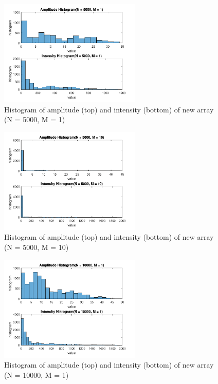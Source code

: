\documentclass{article}
\begin{document}
\begin{figure}[H]
	\centering
	\includegraphics[width = 0.6\textwidth]{src/2pi/hist_5000_1.pdf}
	\caption{Histogram of amplitude (top) and intensity (bottom) of new array (N = 5000, M = 1)}
	\label{fig:hist-5000-1}
\end{figure}
\begin{figure}[H]
	\centering
	\includegraphics[width = 0.6\textwidth]{src/2pi/hist_5000_10.pdf}
	\caption{Histogram of amplitude (top) and intensity (bottom) of new array (N = 5000, M = 10)}
	\label{fig:hist-5000-10}
\end{figure}
\begin{figure}[H]
	\centering
	\includegraphics[width = 0.6\textwidth]{src/2pi/hist_10000_1.pdf}
	\caption{Histogram of amplitude (top) and intensity (bottom) of new array (N = 10000, M = 1)}
	\label{fig:hist-10000-1}
\end{figure}
\end{document}
